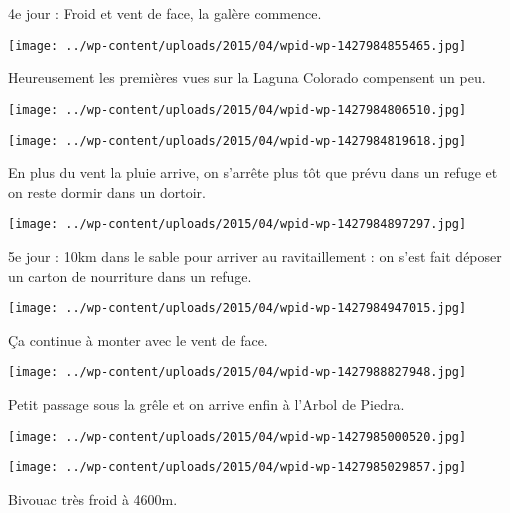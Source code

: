  \newline
 4e jour : \newline
 Froid et vent de face, la galère commence. \newline
 \newline
\centerline{\texttt{[image: ../wp-content/uploads/2015/04/wpid-wp-1427984855465.jpg]} } 
 \newline
 Heureusement les premières vues sur la Laguna Colorado compensent un peu. \newline
 \newline
\centerline{\texttt{[image: ../wp-content/uploads/2015/04/wpid-wp-1427984806510.jpg]} } 
 \newline
 \newline
\centerline{\texttt{[image: ../wp-content/uploads/2015/04/wpid-wp-1427984819618.jpg]} } 
 \newline
 En plus du vent la pluie arrive, on s'arrête plus tôt que prévu dans un refuge et on reste dormir dans un dortoir. \newline
 \newline
\centerline{\texttt{[image: ../wp-content/uploads/2015/04/wpid-wp-1427984897297.jpg]} } 
 \newline
 5e jour : \newline
 10km dans le sable pour arriver au ravitaillement : on s'est fait déposer un carton de nourriture dans un refuge. \newline
 \newline
\centerline{\texttt{[image: ../wp-content/uploads/2015/04/wpid-wp-1427984947015.jpg]} } 
 \newline
 Ça continue à monter avec le vent de face. \newline
 \newline
\centerline{\texttt{[image: ../wp-content/uploads/2015/04/wpid-wp-1427988827948.jpg]} } 
 \newline
 Petit passage sous la grêle et on arrive enfin à l'Arbol de Piedra. \newline
 \newline
\centerline{\texttt{[image: ../wp-content/uploads/2015/04/wpid-wp-1427985000520.jpg]} } 
 \newline
 \newline
\centerline{\texttt{[image: ../wp-content/uploads/2015/04/wpid-wp-1427985029857.jpg]} } 
 \newline
 Bivouac très froid à 4600m. \newline
